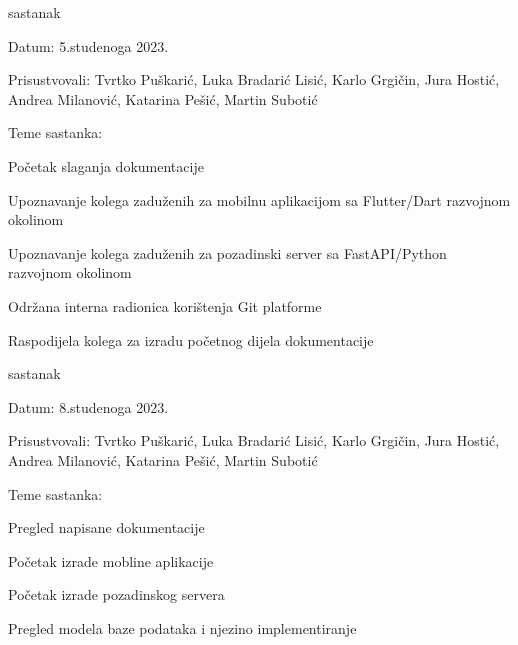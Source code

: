 \begin{packed_enum}
			\item  sastanak
			\item[] \begin{packed_item}
				\item Datum: 5.studenoga 2023.
				\item Prisustvovali: Tvrtko Puškarić, Luka Bradarić Lisić, Karlo Grgičin, Jura Hostić, Andrea Milanović, Katarina Pešić, Martin Subotić
				\item Teme sastanka:
				\begin{packed_item}
					\item Početak slaganja dokumentacije
					\item Upoznavanje kolega zaduženih za mobilnu aplikacijom sa Flutter/Dart razvojnom okolinom
					\item Upoznavanje kolega zaduženih za pozadinski server sa FastAPI/Python razvojnom okolinom
					\item Održana interna radionica korištenja Git platforme
					\item Raspodijela kolega za izradu početnog dijela dokumentacije
				\end{packed_item}
			\end{packed_item}
			
			\item  sastanak
			\item[] \begin{packed_item}
				\item Datum: 8.studenoga 2023.
				\item Prisustvovali: Tvrtko Puškarić, Luka Bradarić Lisić, Karlo Grgičin, Jura Hostić, Andrea Milanović, Katarina Pešić, Martin Subotić
				\item Teme sastanka:
				\begin{packed_item}
					\item Pregled napisane dokumentacije
					\item Početak izrade mobline aplikacije
					\item Početak izrade pozadinskog servera
					\item Pregled modela baze podataka i njezino implementiranje
				\end{packed_item}
			\end{packed_item}
			

\end{packed_enum}
